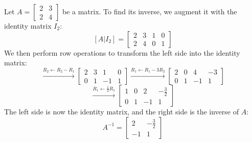 \begin{eg}
    Let $A = \begin{bmatrix}
        2 & 3 \\
        2 & 4
    \end{bmatrix}$ be a matrix. To find its inverse, we augment it with the identity matrix $I_2$:
    \[
        [A | I_2] = \left[\begin{array}{cc|cc}
            2 & 3 & 1 & 0 \\
            2 & 4 & 0 & 1
        \end{array}\right]
    \]
    We then perform row operations to transform the left side into the identity matrix:
    \[
        \xrightarrow{R_2 \leftarrow R_2 - R_1}
        \left[\begin{array}{cc|cc}
            2 & 3 & 1 & 0 \\
            0 & 1 & -1 & 1
        \end{array}\right]
        \xrightarrow{R_1 \leftarrow R_1 - 3R_2}
        \left[\begin{array}{cc|cc}
            2 & 0 & 4 & -3 \\
            0 & 1 & -1 & 1
        \end{array}\right]
    \]
    \[
        \xrightarrow{R_1 \leftarrow \frac{1}{2} R_1}
        \left[\begin{array}{cc|cc}
            1 & 0 & 2 & -\frac{3}{2} \\
            0 & 1 & -1 & 1
        \end{array}\right]
    \]
    The left side is now the identity matrix, and the right side is the inverse of $A$:
    \[
        A^{-1} = \begin{bmatrix}
            2 & -\frac{3}{2} \\
            -1 & 1
        \end{bmatrix}
    \]
\end{eg}

